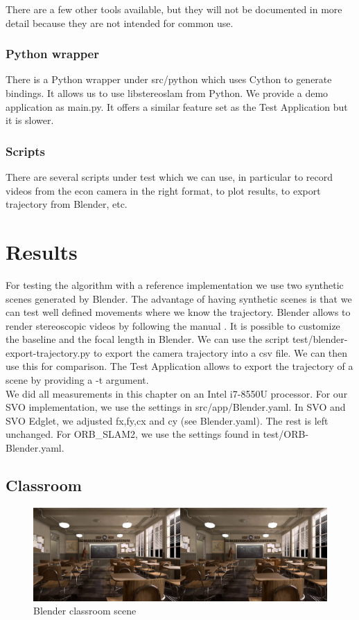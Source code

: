 \documentclass[11pt,a4paper,titlepage,oneside]{report}
\begin{document}
There are a few other tools available, but they will not be documented in more detail because they are not intended for common use.

\subsection{Python wrapper}
There is a Python wrapper under src/python which uses Cython to generate bindings. It allows us to use libstereoslam from Python. We provide a demo application as main.py. It offers a similar feature set as the Test Application but it is slower.

\subsection{Scripts}
There are several scripts under test which we can use, in particular to record videos from the econ camera in the right format, to plot results, to export trajectory from Blender, etc.

\chapter{Results}\label{ch:results}

For testing the algorithm with a reference implementation we use two synthetic scenes generated by Blender. The advantage of having synthetic scenes is that we can test well defined movements where we know the trajectory. Blender allows to render stereoscopic videos by following the manual \cite{blender_stereo}. It is possible to customize the baseline and the focal length in Blender. We can use the script test/blender-export-trajectory.py to export the camera trajectory into a csv file. We can then use this for comparison. The Test Application allows to export the trajectory of a scene by providing a -t argument.\\
We did all measurements in this chapter on an Intel i7-8550U processor. For our SVO implementation, we use the settings in src/app/Blender.yaml. In SVO and SVO Edglet, we adjusted fx,fy,cx and cy (see Blender.yaml). The rest is left unchanged. For ORB\_SLAM2, we use the settings found in test/ORB-Blender.yaml.

\section{Classroom}
\begin{figure}[H]
  \centering
  \includegraphics[width=1.0\textwidth]{img/blender_classroom_scene.png}
  \caption{Blender classroom scene}\label{fig:blender_classroom_scene}
\end{figure}
\end{document}
